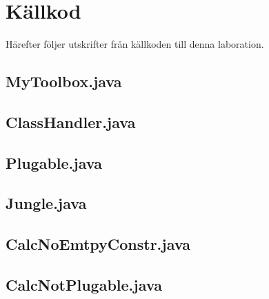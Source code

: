 \documentclass[a4paper, 12pt]{article}
\begin{document}
\newpage
\appendix
{}
\section{Källkod}
Härefter följer utskrifter från källkoden till denna laboration.

\subsection{MyToolbox.java}\label{mytoolbox.java}
\begin{footnotesize}

\end{footnotesize}
\newpage

\subsection{ClassHandler.java}\label{classhandler.java}
\begin{footnotesize}

\end{footnotesize}
\newpage

\subsection{Plugable.java}\label{plugable.java}
\begin{footnotesize}

\end{footnotesize}
\newpage

\subsection{Jungle.java}
\begin{footnotesize}

\end{footnotesize}
\newpage

\subsection{CalcNoEmtpyConstr.java}\label{cnec}
\begin{footnotesize}

\end{footnotesize}
\newpage

\subsection{CalcNotPlugable.java}\label{cnp}
\begin{footnotesize}

\end{footnotesize}
\newpage
\end{document}
